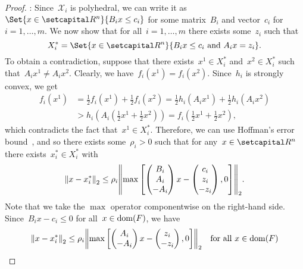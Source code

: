 \documentclass[../main]{subfiles}
\begin{document}
\begin{proof}
    :
    Since~$\mathcal{X}_i$ is polyhedral, we can write it as~$\Set{x \in \setR^n}{B_i x \le c_i}$ for some matrix~$B_i$ and vector~$c_i$ for~$i = 1, \dots, m$.
    We now show that for all~$i = 1, \dots, m$ there exists some~$z_i$ such that
    \begin{equation}
        X_i^* = \Set{x \in \setR^n}{B_i x \le c_i \text{ and } A_i x = z_i}
    .\end{equation}
    To obtain a contradiction, suppose that there exists~$x^1 \in X_i^*$ and~$x^2 \in X_i^*$ such that~$A_i x^1 \neq A_i x^2$.
    Clearly, we have~$f_i(x^1) = f_i(x^2)$.
    Since~$h_i$ is strongly convex, we get
    \begin{align}
        f_i(x^1) &= \frac{1}{2} f_i(x^1) + \frac{1}{2} f_i(x^2) = \frac{1}{2} h_i(A_i x^1) + \frac{1}{2} h_i(A_i x^2) \\
                 &> h_i\left( A_i \left( \frac{1}{2} x^1 + \frac{1}{2} x^2 \right) \right) = f_i\left( \frac{1}{2} x^1 + \frac{1}{2} x^2 \right)  
    ,\end{align}
    which contradicts the fact that~$x^1 \in X_i^*$.
    Therefore, we can use Hoffman's error bound~\cite{Hoffman1952}, and so there exists some~$\rho_i > 0$ such that for any~$x \in \setR^n$ there exists~$x_i^* \in X_i^*$ with
    \begin{equation}
        \norm*{x - x_i^*}_2 \le \rho_i \norm*{\max \left[ \begin{pmatrix} B_i \\ A_i \\ - A_i \end{pmatrix} x - \begin{pmatrix} c_i \\ z_i \\ - z_i \end{pmatrix}, 0 \right] }_2
    .\end{equation}
    Note that we take the $\max$ operator componentwise on the right-hand side.
    Since~$B_i x - c_i \le 0$ for all~$x \in \operatorname{dom}(F)$, we have
    \begin{equation}
        \norm*{x - x_i^*}_2 \le \rho_i \norm*{\max \left[ \begin{pmatrix} A_i \\ - A_i \end{pmatrix} x - \begin{pmatrix} z_i \\ - z_i \end{pmatrix} , 0 \right] }_2 \forallcondition{x \in \dom(F)}

\end{equation}
\end{proof}
\end{document}
